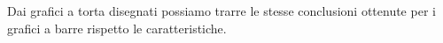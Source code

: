\begin{figure}[!htbp]
    \centering
        \qquad
        \qquad
\end{figure}

Dai grafici a torta disegnati possiamo trarre le stesse conclusioni ottenute 
per i grafici a barre rispetto le caratteristiche.


\newpage